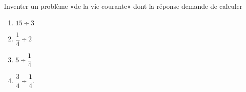 
\begin{exercice}\label{exo2smath-0035}

    Inventer un problème «de la vie courante» dont la réponse demande de calculer
    \begin{enumerate}
        \item
            \( 15\div 3\)
        \item
            \( \dfrac{ 1 }{ 4 }\div 2\)
        \item
            \(  5\div \dfrac{ 1 }{ 4 } \)
        \item
            \( \dfrac{ 3 }{ 4 }\div\dfrac{ 1 }{ 4 }\).
    \end{enumerate}

\end{exercice}
